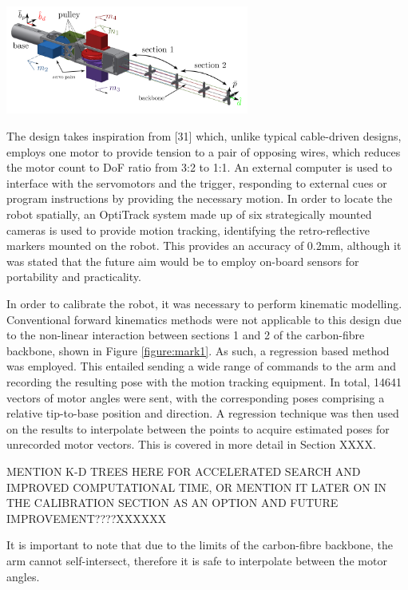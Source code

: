 \documentclass[11pt]{article}
\begin{document}
\begin{center}
\includegraphics[width = 0.6\textwidth]{images/mark1.png}
\label{figure:mark1}
\end{center}

The design takes inspiration from [31] which, unlike typical cable-driven designs, employs one motor
to provide tension to a pair of opposing wires, which reduces the motor count to DoF ratio from 3:2 to 1:1. 
An external computer is used to interface with the servomotors and the trigger, responding to external
cues or program instructions by providing the necessary motion. In order to locate the robot spatially, an OptiTrack system made up of six strategically mounted cameras is
used to provide motion tracking, identifying the retro-reflective markers mounted on the robot. This
provides an accuracy of 0.2mm, although it was stated that the future aim would be to employ
on-board sensors for portability and practicality.


In order to calibrate the robot, it was necessary to perform kinematic modelling. Conventional forward
kinematics methods were not applicable to this design due to the non-linear interaction between sections 1 and 2
of the carbon-fibre backbone, shown in Figure \ref{figure:mark1}. As such, a regression based method was employed.
This entailed sending a wide range of commands to the arm and recording the resulting pose with the
motion tracking equipment. In total, 14641 vectors of motor angles were sent, with the corresponding
poses comprising a relative tip-to-base position and direction. A regression technique
was then used on the results to interpolate between the points to acquire estimated poses for unrecorded
motor vectors. This is covered in more detail in Section XXXX.

MENTION K-D TREES HERE FOR ACCELERATED SEARCH AND IMPROVED COMPUTATIONAL TIME, OR MENTION IT LATER ON IN THE CALIBRATION SECTION AS AN OPTION AND FUTURE IMPROVEMENT????XXXXXX


It is important to note that due to the limits
of the carbon-fibre backbone, the arm cannot self-intersect, therefore it is safe to interpolate
between the motor angles.
\end{document}
